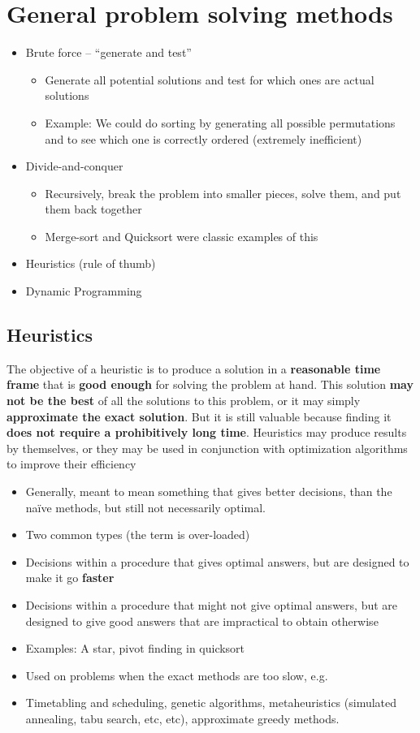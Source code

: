 \documentclass{article}
\begin{document}
\section{General problem solving methods}
\begin{itemize}
	\item Brute force – “generate and test”
	\begin{itemize}
		\item Generate all potential solutions and test for which ones are actual solutions
		\item Example: We could do sorting by generating all possible permutations and to see which one is correctly ordered (extremely inefficient)
	\end{itemize}	
	\item Divide-and-conquer
	\begin{itemize}
		\item Recursively, break the problem into smaller pieces, solve them, and put them back together
		\item Merge-sort and Quicksort were classic examples of this
	\end{itemize}
	\item Heuristics (rule of thumb)
	\item Dynamic Programming
\end{itemize}

\subsection{Heuristics}
\begin{flushleft}
The objective of a heuristic is to produce a solution in a \textbf{reasonable time frame} that is \textbf{good enough} for solving the problem at hand. This solution \textbf{may not be the best} of all the solutions to this problem, or it may simply \textbf{approximate the exact solution}. But it is still valuable because finding it \textbf{does not require a prohibitively long time}. Heuristics may produce results by themselves, or they may be used in conjunction with optimization algorithms to improve their efficiency
\end{flushleft}
		\begin{itemize}
			\item Generally, meant to mean something that gives better decisions, than the naïve methods, but still not necessarily optimal.
			\item Two common types (the term is over-loaded)
			\item Decisions within a procedure that gives optimal answers, but are designed to make it go \textbf{faster}
			\item Decisions within a procedure that might not give optimal answers, but are designed to give good answers that are impractical to obtain otherwise
			\item Examples: A star, pivot finding in quicksort
			\item Used on problems when the exact methods are too slow, e.g.
			\item Timetabling and scheduling, genetic algorithms, metaheuristics (simulated annealing, tabu search, etc, etc), approximate greedy methods.		
		\end{itemize}
\end{document}
